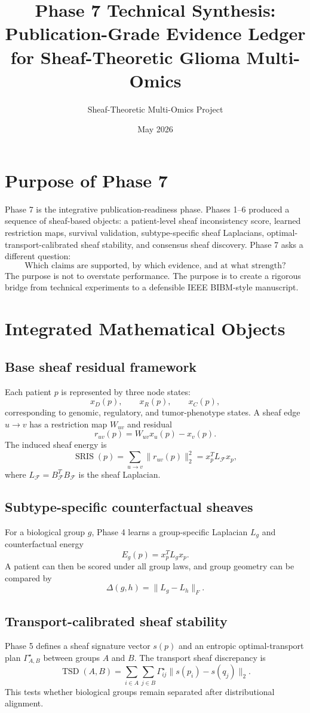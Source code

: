 \documentclass[11pt]{article}
\title{Phase 7 Technical Synthesis: Publication-Grade Evidence Ledger for Sheaf-Theoretic Glioma Multi-Omics}
\author{Sheaf-Theoretic Multi-Omics Project}
\date{May 2026}
\begin{document}
\maketitle
\tableofcontents
\newpage

\section{Purpose of Phase 7}
Phase 7 is the integrative publication-readiness phase. Phases 1--6 produced a sequence of sheaf-based objects: a patient-level sheaf inconsistency score, learned restriction maps, survival validation, subtype-specific sheaf Laplacians, optimal-transport-calibrated sheaf stability, and consensus sheaf discovery. Phase 7 asks a different question:
\[
\text{Which claims are supported, by which evidence, and at what strength?}
\]
The purpose is not to overstate performance. The purpose is to create a rigorous bridge from technical experiments to a defensible IEEE BIBM-style manuscript.

\section{Integrated Mathematical Objects}
\subsection{Base sheaf residual framework}
Each patient $p$ is represented by three node states:
\[
    x_D(p),\qquad x_R(p),\qquad x_C(p),
\]
corresponding to genomic, regulatory, and tumor-phenotype states. A sheaf edge $u\to v$ has a restriction map $W_{uv}$ and residual
\[
    r_{uv}(p)=W_{uv}x_u(p)-x_v(p).
\]
The induced sheaf energy is
\[
    \operatorname{SRIS}(p)=\sum_{u\to v}\|r_{uv}(p)\|_2^2=x_p^T L_{\mathcal F}x_p,
\]
where $L_{\mathcal F}=B_{\mathcal F}^T B_{\mathcal F}$ is the sheaf Laplacian.

\subsection{Subtype-specific counterfactual sheaves}
For a biological group $g$, Phase 4 learns a group-specific Laplacian $L_g$ and counterfactual energy
\[
    E_g(p)=x_p^T L_gx_p.
\]
A patient can then be scored under all group laws, and group geometry can be compared by
\[
    \Delta(g,h)=\|L_g-L_h\|_F.
\]

\subsection{Transport-calibrated sheaf stability}
Phase 5 defines a sheaf signature vector $s(p)$ and an entropic optimal-transport plan $\Gamma^{\star}_{A,B}$ between groups $A$ and $B$. The transport sheaf discrepancy is
\[
    \operatorname{TSD}(A,B)=\sum_{i\in A}\sum_{j\in B}\Gamma^{\star}_{ij}\|s(p_i)-s(q_j)\|_2.
\]
This tests whether biological groups remain separated after distributional alignment.
\end{document}
